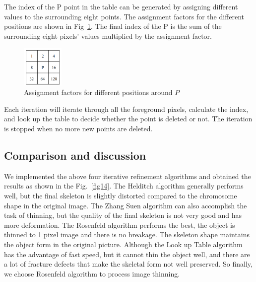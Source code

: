 \documentclass[hyperref]{article}
\theoremstyle{nonumberplain}
\begin{document}
	The index of the P point in the table can be generated by assigning different values to the surrounding eight points. The assignment factors for the different positions are shown in Fig~\ref{fig13}. The final index of the P is the sum of the surrounding eight pixels’ values multiplied by the assignment factor.
	
	\begin{figure}[htbp]
		\centering
		\centering
		\includegraphics[width=2cm]{Look up table.png}
		\caption{Assignment factors for different positions around $P$}
		\label{fig13}
	\end{figure}
	
	Each iteration will iterate through all the foreground pixels, calculate the index, and look up the table to decide whether the point is deleted or not. The iteration is stopped when no more new points are deleted.
	
	\subsection{Comparison and discussion}
	
	\hspace{1.0em}
	We implemented the above four iterative refinement algorithms and obtained the results as shown in the Fig.~\ref{fig14}. The Helditch algorithm generally performs well, but the final skeleton is slightly distorted compared to the chromosome shape in the original image. The Zhang Suen algorithm can also accomplish the task of thinning, but the quality of the final skeleton is not very good and has more deformation. The Rosenfeld algorithm performs the best, the object is thinned to 1 pixel image and there is no breakage. The skeleton shape maintains the object form in the original picture. Although the Look up Table algorithm has the advantage of fast speed, but it cannot thin the object well, and there are a lot of fracture defects that make the skeletal form not well preserved. So finally, we choose Rosenfeld algorithm to process image thinning.
\end{document}
